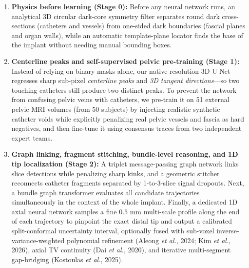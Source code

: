 \documentclass[
  11pt,
]{article}
\providecommand{\tightlist}{%
  \setlength{\itemsep}{0pt}\setlength{\parskip}{0pt}}
\begin{document}
\begin{enumerate}
\def\labelenumi{\arabic{enumi}.}
\tightlist
\item
  \textbf{Physics before learning (Stage 0):} Before any neural network
  runs, an analytical 3D circular dark-core symmetry filter separates
  round dark cross-sections (catheters and vessels) from one-sided dark
  boundaries (fascial planes and organ walls), while an automatic
  template-plane locator finds the base of the implant without needing
  manual bounding boxes.
\item
  \textbf{Centerline peaks and self-supervised pelvic pre-training
  (Stage 1):} Instead of relying on binary masks alone, our
  native-resolution 3D U-Net regresses sharp sub-pixel \emph{centerline
  peaks} and \emph{3D tangent directions}---so two touching catheters
  still produce two distinct peaks. To prevent the network from
  confusing pelvic veins with catheters, we pre-train it on 51 external
  pelvic MRI volumes (from 50 subjects) by injecting realistic synthetic
  catheter voids while explicitly penalizing real pelvic vessels and
  fascia as hard negatives, and then fine-tune it using consensus traces
  from two independent expert teams.
\item
  \textbf{Graph linking, fragment stitching, bundle-level reasoning, and
  1D tip localization (Stage 2):} A triplet message-passing graph
  network links slice detections while penalizing sharp kinks, and a
  geometric stitcher reconnects catheter fragments separated by
  1-to-3-slice signal dropouts. Next, a bundle graph transformer
  evaluates all candidate trajectories simultaneously in the context of
  the whole implant. Finally, a dedicated 1D axial neural network
  samples a fine \(0.5\text{ mm}\) multi-scale profile along the end of
  each trajectory to pinpoint the exact distal tip and output a
  calibrated split-conformal uncertainty interval, optionally fused with
  sub-voxel inverse-variance-weighted polynomial refinement (Aleong
  \emph{et al.}, 2024; Kim \emph{et al.}, 2026), axial TV continuity
  (Dai \emph{et al.}, 2020), and iterative multi-segment gap-bridging
  (Kostoulas \emph{et al.}, 2025).
\end{enumerate}
\end{document}
